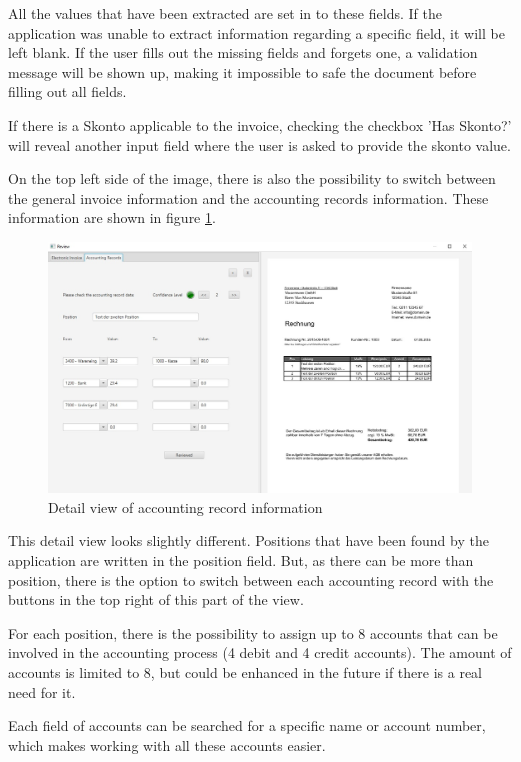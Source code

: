 All the values that have been extracted are set in to these fields. If the application was unable to extract information regarding a specific field, it will be left blank. If the user fills out the missing fields and forgets one, a validation message will be shown up, making it impossible to safe the document before filling out all fields.

If there is a Skonto applicable to the invoice, checking the checkbox 'Has Skonto?' will reveal another input field where the user is asked to provide the skonto value.

On the top left side of the image, there is also the possibility to switch between the general invoice information and the accounting records information. These information are shown in figure \ref{reviewAR}.

\begin{figure}[ht!]
\centering
\includegraphics[width=\textwidth]{Images/GUI/ReviewAR.jpg}
\caption{Detail view of accounting record information \label{reviewAR}}
\end{figure}

This detail view looks slightly different. Positions that have been found by the application are written in the position field. But, as there can be more than position, there is the option to switch between each accounting record with the buttons in the top right of this part of the view.

For each position, there is the possibility to assign up to 8 accounts that can be involved in the accounting process (4 debit and 4 credit accounts). The amount of accounts is limited to 8, but could be enhanced in the future if there is a real need for it.

Each field of accounts can be searched for a specific name or account number, which makes working with all these accounts easier.

